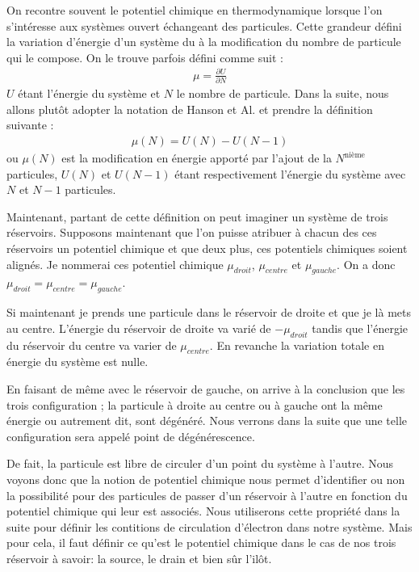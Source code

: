 On recontre souvent le potentiel chimique en thermodynamique lorsque l'on s'intéresse aux systèmes ouvert échangeant des particules. Cette grandeur défini la variation d'énergie d'un système du à la modification du nombre de particule qui le compose. On le trouve parfois défini comme suit :
\begin{eqnarray}
\mu = \frac{\partial U}{\partial N} \nonumber
\end{eqnarray}
$U$ étant l'énergie du système et $N$ le nombre de particule. Dans la suite, nous allons plut\^ot adopter la notation de Hanson et Al. et prendre la définition suivante :
\begin{eqnarray}
\mu(N) = U(N) - U(N-1)
\end{eqnarray}
ou $\mu(N)$ est la modification en énergie apporté par l'ajout de la $N^\text{nième}$ particules, $U(N)$ et $U(N-1)$ étant respectivement l'énergie du système avec $N$ et $N-1$ particules.

Maintenant, partant de cette définition on peut imaginer un système de trois réservoirs. Supposons maintenant que l'on puisse atribuer à chacun des ces réservoirs un potentiel chimique et que deux plus, ces potentiels chimiques soient alignés. Je nommerai ces potentiel chimique $\mu_{droit}$, $\mu_{centre}$ et $\mu_{gauche}$. On a donc $\mu_{droit}=\mu_{centre}=\mu_{gauche}$.

Si maintenant je prends une particule dans le réservoir de droite et que je là mets au centre. L'énergie du réservoir de droite va varié de $-\mu_{droit}$ tandis que l'énergie du réservoir du centre va varier de $\mu_{centre}$. En revanche la variation totale en énergie du système est nulle. 

En faisant de m\^eme avec le réservoir de gauche, on arrive à la conclusion que les trois configuration ; la particule à droite au centre ou à gauche ont la m\^eme énergie ou autrement dit, sont dégénéré. Nous verrons dans la suite que une telle configuration sera appelé point de dégénérescence. 

De fait, la particule est libre de circuler d'un point du système à l'autre. Nous voyons donc que la notion de potentiel chimique nous permet d'identifier ou non la possibilité pour des particules de passer d'un réservoir à l'autre en fonction du potentiel chimique qui leur est associés. Nous utiliserons cette propriété dans la suite pour définir les contitions de circulation d'électron dans notre système. Mais pour cela, il faut définir ce qu'est le potentiel chimique dans le cas de nos trois réservoir à savoir: la source, le drain et bien sûr l'ilôt.



